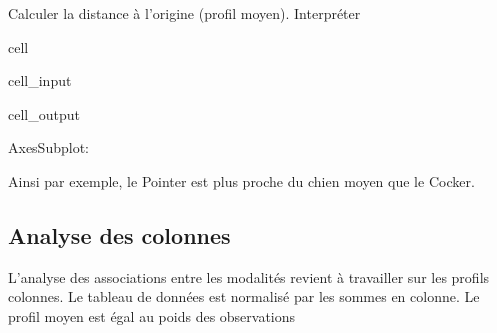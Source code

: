 \documentclass[letterpaper,10pt,french]{sphinxmanual}
\begin{document}
\sphinxAtStartPar
Calculer la distance à l’origine (profil moyen). Interpréter

\begin{sphinxuseclass}{cell}
\begin{sphinxuseclass}{cell_input}
\begin{sphinxVerbatim}[commandchars=\\\{\}]
  \PYG{p}{[}\PYG{p}{]}

  


 
\end{sphinxVerbatim}

\end{sphinxuseclass}
\begin{sphinxuseclass}{cell_output}
\begin{sphinxVerbatim}[commandchars=\\\{\}]
\PYGZlt{}AxesSubplot:\PYGZgt{}
\end{sphinxVerbatim}

\noindent{}

\end{sphinxuseclass}
\end{sphinxuseclass}
\sphinxAtStartPar
Ainsi par exemple, le Pointer est plus proche du chien moyen que le Cocker.


\subsection{Analyse des colonnes}
\label{\detokenize{TP3_AFC_ACM:analyse-des-colonnes}}
\sphinxAtStartPar
L’analyse des associations entre les modalités revient à travailler sur les profils colonnes. Le tableau de données est normalisé par les sommes en colonne. Le profil moyen est égal au poids des observations
\end{document}
